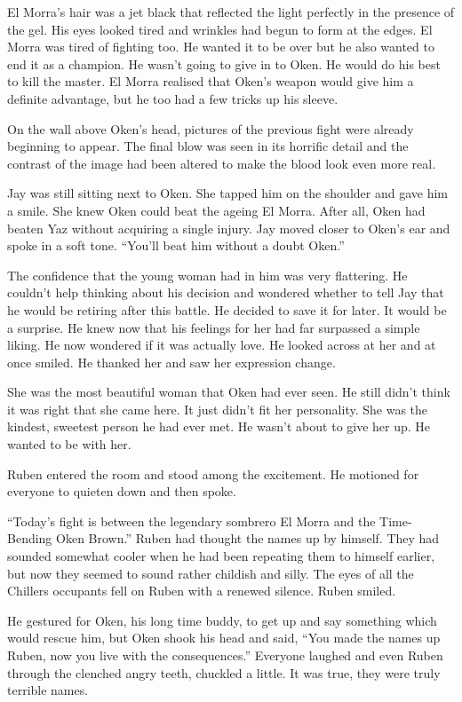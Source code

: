 El Morra's hair was a jet black that reflected the light perfectly in the presence of the gel.  His eyes looked tired and wrinkles had begun to form at the edges.  El Morra was tired of fighting too.  He wanted it to be over but he also wanted to end it as a champion.  He wasn't going to give in to Oken.  He would do his best to kill the master.  El Morra realised that Oken's weapon would give him a definite advantage, but he too had a few tricks up his sleeve.

On the wall above Oken's head, pictures of the previous fight were already beginning to appear.  The final blow was seen in its horrific detail and the contrast of the image had been altered to make the blood look even more real.

Jay was still sitting next to Oken.  She tapped him on the shoulder and gave him a smile.  She knew Oken could beat the ageing El Morra.  After all, Oken had beaten Yaz without acquiring a single injury.  Jay moved closer to Oken's ear and spoke in a soft tone.  ``You'll beat him without a doubt Oken.''  

The confidence that the young woman had in him was very flattering.  He couldn't help thinking about his decision and wondered whether to tell Jay that he would be retiring after this battle.  He decided to save it for later.  It would be a surprise.  He knew now that his feelings for her had far surpassed a simple liking.  He now wondered if it was actually love.  He looked across at her and at once smiled.  He thanked her and saw her expression change.

She was the most beautiful woman that Oken had ever seen.  He still didn't think it was right that she came here.  It just didn't fit her personality.  She was the kindest, sweetest person he had ever met.  He wasn't about to give her up.  He wanted to be with her.

Ruben entered the room and stood among the excitement.  He motioned for everyone to quieten down and then spoke. 

``Today's fight is between the legendary sombrero El Morra and the Time-Bending Oken Brown.''  Ruben had thought the names up by himself.  They had sounded somewhat cooler when he had been repeating them to himself earlier, but now they seemed to sound rather childish and silly.  The eyes of all the Chillers occupants fell on Ruben with a renewed silence.  Ruben smiled.  

He gestured for Oken, his long time buddy, to get up and say something which would rescue him, but Oken shook his head and said, ``You made the names up Ruben, now you live with the consequences.''  Everyone laughed and even Ruben through the clenched angry teeth, chuckled a little.  It was true, they were truly terrible names.

